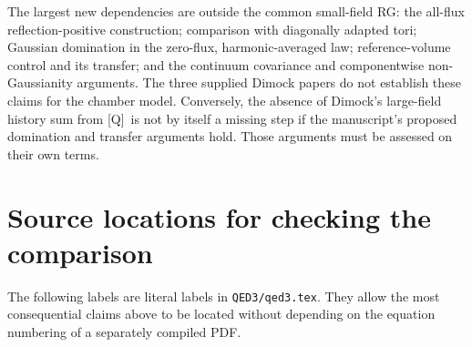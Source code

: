 \documentclass[11pt]{article}
\numberwithin{equation}{section}
\newcommand{\Q}{\textup{[Q]}}
\begin{document}
The largest new dependencies are outside the common small-field RG:
the all-flux reflection-positive construction; comparison with
diagonally adapted tori; Gaussian domination in the zero-flux,
harmonic-averaged law; reference-volume control and its transfer;
and the continuum covariance and componentwise non-Gaussianity
arguments. The three supplied Dimock papers do not establish these
claims for the chamber model. Conversely, the absence of Dimock's
large-field history sum from \Q\ is not by itself a missing step if
the manuscript's proposed domination and transfer arguments hold.
Those arguments must be assessed on their own terms.

\section{Source locations for checking the comparison}

The following labels are literal labels in \texttt{QED3/qed3.tex}.
They allow the most consequential claims above to be located without
depending on the equation numbering of a separately compiled PDF.
\end{document}
